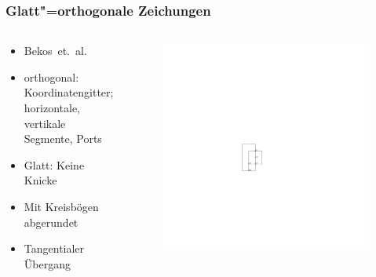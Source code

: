 \documentclass{beamer}
\begin{document}
\begin{frame}
  \frametitle{Glatt"=orthogonale Zeichungen}
\begin{columns}[c]
\begin{column}{5cm}
  \begin{itemize}[<+->]
    \item Bekos~et.~al.~\cite{bekos-13}
    \item orthogonal: Koordinatengitter; horizontale, vertikale Segmente, Ports
    \item Glatt: Keine Knicke
    \item Mit Kreisbögen abgerundet
    \item Tangentialer Übergang
  \end{itemize}
\end{column}
\begin{column}{5cm}
\begin{figure}[h]
  \centering
  \includegraphics[scale=.7]{exampleA/orthogonalCompress}
  \label{fig:exampleAorthogonalNocompress}
\end{figure}
\begin{figure}[h]
  \centering

\end{figure}
\end{column}
\end{columns}
\end{frame}
\end{document}
